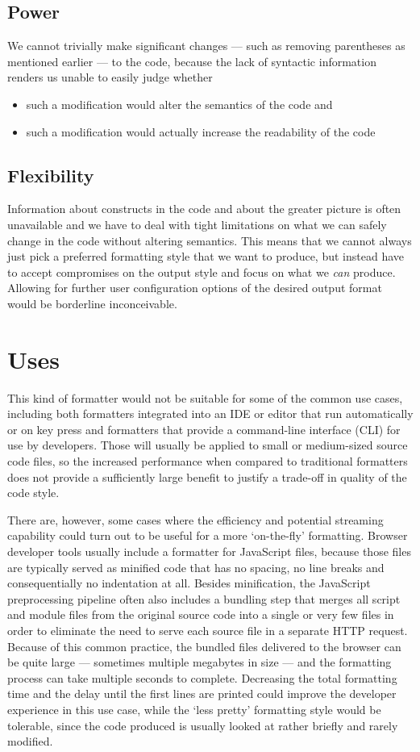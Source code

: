 \subsection{Power}
We cannot trivially make significant changes --- such as removing parentheses as mentioned earlier ---
to the code, because the lack of syntactic information renders us unable to easily judge whether
\begin{itemize}
  \item such a modification would alter the semantics of the code and
  \item such a modification would actually increase the readability of the code
\end{itemize}

\subsection{Flexibility}
Information about constructs in the code and about the greater picture is often unavailable and
we have to deal with tight limitations on what we can safely change in the code without altering semantics.
This means that we cannot always just pick a preferred formatting style that we want to produce,
but instead have to accept compromises on the output style and focus on what we \textit{can} produce.
Allowing for further user configuration options of the desired output format would be borderline inconceivable.

\section{Uses}
This kind of formatter would not be suitable for some of the common use cases, including both
formatters integrated into an IDE or editor that run automatically or on key press and
formatters that provide a command-line interface (CLI) for use by developers.
Those will usually be applied to small or medium-sized source code files,
so the increased performance when compared to traditional formatters does not provide
a sufficiently large benefit to justify a trade-off in quality of the code style.

There are, however, some cases where the efficiency and potential streaming capability could
turn out to be useful for a more `on-the-fly' formatting.
Browser developer tools usually include a formatter for JavaScript files,
because those files are typically served as minified code that has
no spacing, no line breaks and consequentially no indentation at all.
Besides minification, the JavaScript preprocessing pipeline often also includes a bundling step
that merges all script and module files from the original source code into a single or very few
files in order to eliminate the need to serve each source file in a separate HTTP request.
Because of this common practice, the bundled files delivered to the browser can be quite large ---
sometimes multiple megabytes in size --- and the formatting process can take multiple seconds to complete.
Decreasing the total formatting time and the delay until the first lines are printed
could improve the developer experience in this use case,
while the `less pretty' formatting style would be tolerable,
since the code produced is usually looked at rather briefly and rarely modified.

